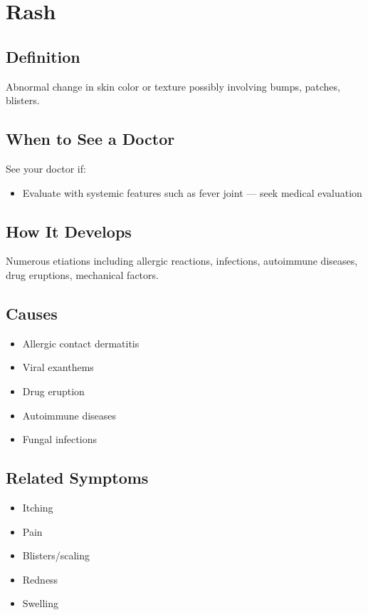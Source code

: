 \chapter{Rash}

\section*{Definition}
Abnormal change in skin color or texture possibly involving bumps, patches, blisters.

\section*{When to See a Doctor}
See your doctor if:
\begin{itemize}
  \item Evaluate with systemic features such as fever joint — seek medical evaluation
\end{itemize}

\section*{How It Develops}
Numerous etiations including allergic reactions, infections, autoimmune diseases, drug eruptions, mechanical factors.

\section*{Causes}
\begin{itemize}
  \item Allergic contact dermatitis
  \item Viral exanthems
  \item Drug eruption
  \item Autoimmune diseases
  \item Fungal infections
\end{itemize}

\section*{Related Symptoms}
\begin{itemize}
  \item Itching
  \item Pain
  \item Blisters/scaling
  \item Redness
  \item Swelling
\end{itemize}


